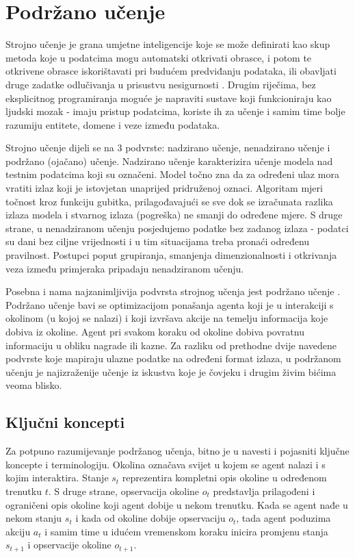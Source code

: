 \chapter{Podržano učenje}

Strojno učenje  je grana umjetne inteligencije  koje se može definirati kao skup metoda koje u podatcima mogu automatski otkrivati obrasce, i potom te otkrivene obrasce iskorištavati pri budućem predviđanju podataka, ili obavljati druge zadatke odlučivanja u prisustvu nesigurnosti \cite{CupicUvod}. Drugim riječima, bez eksplicitnog programiranja moguće je napraviti sustave koji funkcioniraju kao ljudski mozak - imaju pristup podatcima, koriste ih za učenje i samim time bolje razumiju entitete, domene i veze između podataka. 

Strojno učenje dijeli se na 3 podvrste: nadzirano učenje, nenadzirano učenje i podržano (ojačano) učenje. Nadzirano učenje  karakterizira učenje modela nad testnim podatcima koji su označeni. Model točno zna da za određeni ulaz mora vratiti izlaz koji je istovjetan unaprijed pridruženoj oznaci. Algoritam mjeri točnost kroz funkciju gubitka, prilagođavajući se sve dok se izračunata razlika izlaza modela i stvarnog izlaza (pogreška) ne smanji do određene mjere. S druge strane, u nenadziranom učenju  posjedujemo podatke bez zadanog izlaza - podatci su dani bez ciljne vrijednosti i u tim situacijama treba pronaći određenu pravilnost. Postupci poput grupiranja, smanjenja dimenzionalnosti i otkrivanja veza između primjeraka pripadaju nenadziranom učenju.

Posebna i nama najzanimljivija podvrsta strojnog učenja jest podržano učenje . Podržano učenje bavi se optimizacijom ponašanja agenta koji je u interakciji s okolinom (u kojoj se nalazi) i koji izvršava akcije na temelju informacija koje dobiva iz okoline. Agent pri svakom koraku od okoline dobiva povratnu informaciju u obliku nagrade ili kazne. Za razliku od prethodne dvije navedene podvrste koje mapiraju ulazne podatke na određeni format izlaza, u podržanom učenju je najizraženije učenje iz iskustva koje je čovjeku i drugim živim bićima veoma blisko.

\section{Ključni koncepti}
\label{chap:kljucni-koncepti}

Za potpuno razumijevanje podržanog učenja, bitno je u navesti i pojasniti ključne koncepte i terminologiju. Okolina  označava svijet u kojem se agent nalazi i s kojim interaktira. Stanje $s_t$  reprezentira kompletni opis okoline u određenom trenutku $t$. S druge strane, opservacija okoline $o_t$  predstavlja prilagođeni i ograničeni opis okoline koji agent dobije u nekom trenutku. Kada se agent nađe u nekom stanju $s_t$ i kada od okoline dobije opservaciju $o_t$, tada agent poduzima akciju $a_t$  i samim time u idućem vremenskom koraku inicira promjenu stanja $s_{t+1}$ i opservacije okoline $o_{t+1}$. 

